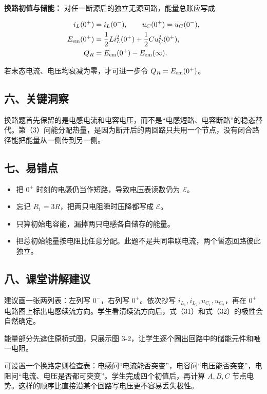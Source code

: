 \documentclass[12pt,a4paper,UTF8]{ctexart}
\newcommand{\tightlist}{\setlength{\itemsep}{0pt}\setlength{\parskip}{0pt}}
\begin{document}
\textbf{换路初值与储能：} 对任一断源后的独立无源回路，能量总账应写成

\[\begin{aligned}
i_L(0^+)&=i_L(0^-),\qquad
u_C(0^+)=u_C(0^-),\\
E_{\rm em}(0^+)&=\frac12Li_L^2(0^+)
+\frac12Cu_C^2(0^+),\\
Q_R&=E_{\rm em}(0^+)-E_{\rm em}(\infty).
\end{aligned}\]

若末态电流、电压均衰减为零，才可进一步令 \(Q_R=E_{\rm em}(0^+)\)。

\subsection{六、关键洞察}\label{ux516dux5173ux952eux6d1eux5bdf-2}

换路题首先保留的是电感电流和电容电压，而不是``电感短路、电容断路''的稳态替代。第（3）问能分配热量，是因为断开后的两回路只共用一个节点，没有闭合路径能把能量从一侧传到另一侧。

\subsection{七、易错点}\label{ux4e03ux6613ux9519ux70b9-2}

\begin{itemize}
\tightlist
\item
  把 \(0^+\) 时刻的电感仍当作短路，导致电压表读数仍为 \(\mathcal E\)。
\item
  忘记 \(R_1=3R\)，把两只电阻瞬时压降都写成 \(\mathcal E\)。
\item
  只算初始电容能，漏掉两只电感各自储存的能量。
\item
  把总初始能量按电阻比任意分配。此题不是共同串联电流，两个暂态回路彼此独立。
\end{itemize}

\subsection{八、课堂讲解建议}\label{ux516bux8bfeux5802ux8bb2ux89e3ux5efaux8bae-2}

建议画一张两列表：左列写 \(0^-\)，右列写 \(0^+\)。依次抄写
\(i_{L_1},i_{L_2},u_{C_1},u_{C_2}\)，再在 \(0^+\)
电路图上标出电感续流方向。学生看清续流方向后，式（31）和式（32）的极性会自然确定。

能量部分先遮住原桥式图，只展示图
3-2，让学生逐个圈出回路中的储能元件和唯一电阻。

可设置一个换路定则检查表：电感问``电流能否突变''，电容问``电压能否突变''，电阻问``电流、电压是否都可突变''。学生完成四个初值后，再计算
\(A,B,C\) 节点电势。这样的顺序比直接沿某个回路写电压更不容易丢失极性。
\end{document}
